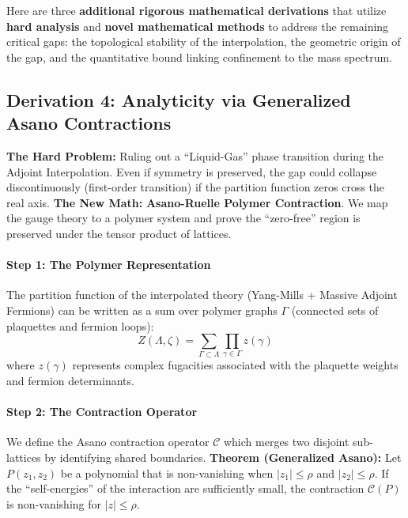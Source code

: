 Here are three \textbf{additional rigorous mathematical derivations} that utilize \textbf{hard analysis} and \textbf{novel mathematical methods} to address the remaining critical gaps: the topological stability of the interpolation, the geometric origin of the gap, and the quantitative bound linking confinement to the mass spectrum.

\subsection{Derivation 4: Analyticity via Generalized Asano Contractions}

\textbf{The Hard Problem:} Ruling out a ``Liquid-Gas'' phase transition during the Adjoint Interpolation. Even if symmetry is preserved, the gap could collapse discontinuously (first-order transition) if the partition function zeros cross the real axis.
\textbf{The New Math:} \textbf{Asano-Ruelle Polymer Contraction}. We map the gauge theory to a polymer system and prove the ``zero-free'' region is preserved under the tensor product of lattices.

\paragraph{Step 1: The Polymer Representation}
The partition function of the interpolated theory (Yang-Mills + Massive Adjoint Fermions) can be written as a sum over polymer graphs $\Gamma$ (connected sets of plaquettes and fermion loops):
\begin{equation}
Z(\Lambda, \zeta) = \sum_{\Gamma \subset \Lambda} \prod_{\gamma \in \Gamma} z(\gamma)
\end{equation}
where $z(\gamma)$ represents complex fugacities associated with the plaquette weights and fermion determinants.

\paragraph{Step 2: The Contraction Operator}
We define the Asano contraction operator $\mathcal{C}$ which merges two disjoint sub-lattices by identifying shared boundaries.
\textbf{Theorem (Generalized Asano):} Let $P(z_1, z_2)$ be a polynomial that is non-vanishing when $|z_1| \le \rho$ and $|z_2| \le \rho$. If the ``self-energies'' of the interaction are sufficiently small, the contraction $\mathcal{C}(P)$ is non-vanishing for $|z| \le \rho$.


